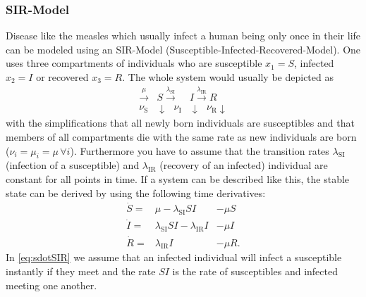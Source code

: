\subsubsection{SIR-Model}
Disease like the measles which usually infect a human being only once in their life can be modeled using an SIR-Model (Susceptible-Infected-Recovered-Model). One uses three compartments of individuals who are susceptible $x_1 = S$, infected $x_2=I$ or recovered $x_3=R$. The whole system would usually be depicted as 
\begin{eqnarray}
\xrightarrow{\mu} &S \xrightarrow{\lambda_\text{SI}} &I  \xrightarrow{\lambda_\text{IR}} R  \\
{\nu_\text{S}} & \downarrow \text{         }\nu_\text{I} &\downarrow \text{  } {\nu_\text{R}} \downarrow \nonumber
\end{eqnarray}
with the simplifications that all newly born individuals are susceptibles and that members of all compartments die with the same rate as new individuals are born ($\nu_i = \mu_i = \mu\, \forall i$). Furthermore you have to assume that the transition rates $\lambda_\text{SI}$ (infection of a susceptible) and $\lambda_\text{IR}$ (recovery of an infected) individual are constant for all points in time.
If a system can be described like this, the stable state can be derived by using the following time derivatives:
\begin{eqnarray}
\dot{S} =& \mu -\lambda_\text{SI} SI &-  \mu S  \label{eq:sdotSIR}\\ 
\dot{I} =& \lambda_\text{SI} SI - \lambda_\text{IR} I  &-\mu I \\
\dot{R} =& \lambda_\text{IR} I & -\mu R. \label{eq:rdotsir}
\end{eqnarray}
In \ref{eq:sdotSIR} we assume that an infected individual will infect a susceptible instantly if they meet and the rate $SI$ is the rate of susceptibles and infected meeting one another. 
